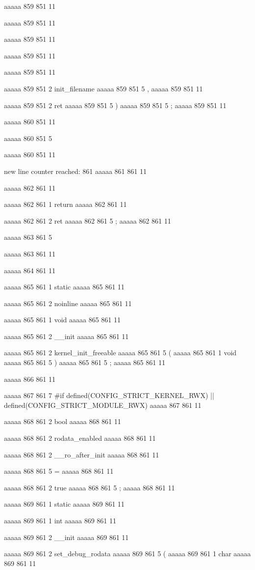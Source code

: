 {{aaaaa 859 851
11
 
aaaaa 859 851
11
 
aaaaa 859 851
11
 
aaaaa 859 851
11
 
aaaaa 859 851
11
 
aaaaa 859 851
2
init_filename
aaaaa 859 851
5
,
aaaaa 859 851
11
 
aaaaa 859 851
2
ret
aaaaa 859 851
5
)
aaaaa 859 851
5
;
aaaaa 859 851
11


aaaaa 860 851
11
	
aaaaa 860 851
5
}
aaaaa 860 851
11


new line counter reached: 861
aaaaa 861 861
11


aaaaa 862 861
11
	
aaaaa 862 861
1
return
aaaaa 862 861
11
 
aaaaa 862 861
2
ret
aaaaa 862 861
5
;
aaaaa 862 861
11


aaaaa 863 861
5
}
aaaaa 863 861
11


aaaaa 864 861
11


aaaaa 865 861
1
static
aaaaa 865 861
11
 
aaaaa 865 861
2
noinline
aaaaa 865 861
11
 
aaaaa 865 861
1
void
aaaaa 865 861
11
 
aaaaa 865 861
2
__init
aaaaa 865 861
11
 
aaaaa 865 861
2
kernel_init_freeable
aaaaa 865 861
5
(
aaaaa 865 861
1
void
aaaaa 865 861
5
)
aaaaa 865 861
5
;
aaaaa 865 861
11


aaaaa 866 861
11


aaaaa 867 861
7
#if defined(CONFIG_STRICT_KERNEL_RWX) || defined(CONFIG_STRICT_MODULE_RWX)
aaaaa 867 861
11


aaaaa 868 861
2
bool
aaaaa 868 861
11
 
aaaaa 868 861
2
rodata_enabled
aaaaa 868 861
11
 
aaaaa 868 861
2
__ro_after_init
aaaaa 868 861
11
 
aaaaa 868 861
5
=
aaaaa 868 861
11
 
aaaaa 868 861
2
true
aaaaa 868 861
5
;
aaaaa 868 861
11


aaaaa 869 861
1
static
aaaaa 869 861
11
 
aaaaa 869 861
1
int
aaaaa 869 861
11
 
aaaaa 869 861
2
__init
aaaaa 869 861
11
 
aaaaa 869 861
2
set_debug_rodata
aaaaa 869 861
5
(
aaaaa 869 861
1
char
aaaaa 869 861
11
 
